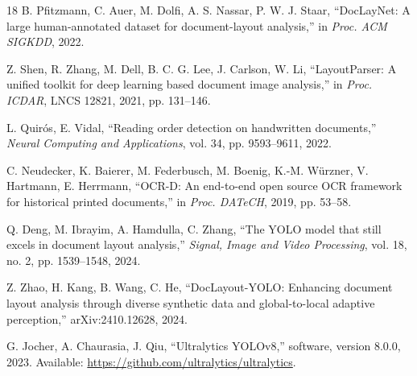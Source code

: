\documentclass[5p,times,twocolumn]{elsarticle}
\begin{document}
\begin{thebibliography}{18}
B. Pfitzmann, C. Auer, M. Dolfi, A. S. Nassar, P. W. J. Staar, ``DocLayNet: A large human-annotated dataset for document-layout analysis,'' in \emph{Proc. ACM SIGKDD}, 2022.

Z. Shen, R. Zhang, M. Dell, B. C. G. Lee, J. Carlson, W. Li, ``LayoutParser: A unified toolkit for deep learning based document image analysis,'' in \emph{Proc. ICDAR}, LNCS 12821, 2021, pp. 131--146.

L. Quir\'os, E. Vidal, ``Reading order detection on handwritten documents,'' \emph{Neural Computing and Applications}, vol. 34, pp. 9593--9611, 2022.

C. Neudecker, K. Baierer, M. Federbusch, M. Boenig, K.-M. W\"urzner, V. Hartmann, E. Herrmann, ``OCR-D: An end-to-end open source OCR framework for historical printed documents,'' in \emph{Proc. DATeCH}, 2019, pp. 53--58.

Q. Deng, M. Ibrayim, A. Hamdulla, C. Zhang, ``The YOLO model that still excels in document layout analysis,'' \emph{Signal, Image and Video Processing}, vol. 18, no. 2, pp. 1539--1548, 2024.

Z. Zhao, H. Kang, B. Wang, C. He, ``DocLayout-YOLO: Enhancing document layout analysis through diverse synthetic data and global-to-local adaptive perception,'' arXiv:2410.12628, 2024.

G. Jocher, A. Chaurasia, J. Qiu, ``Ultralytics YOLOv8,'' software, version 8.0.0, 2023. Available: \url{https://github.com/ultralytics/ultralytics}.

\end{thebibliography}
\end{document}
